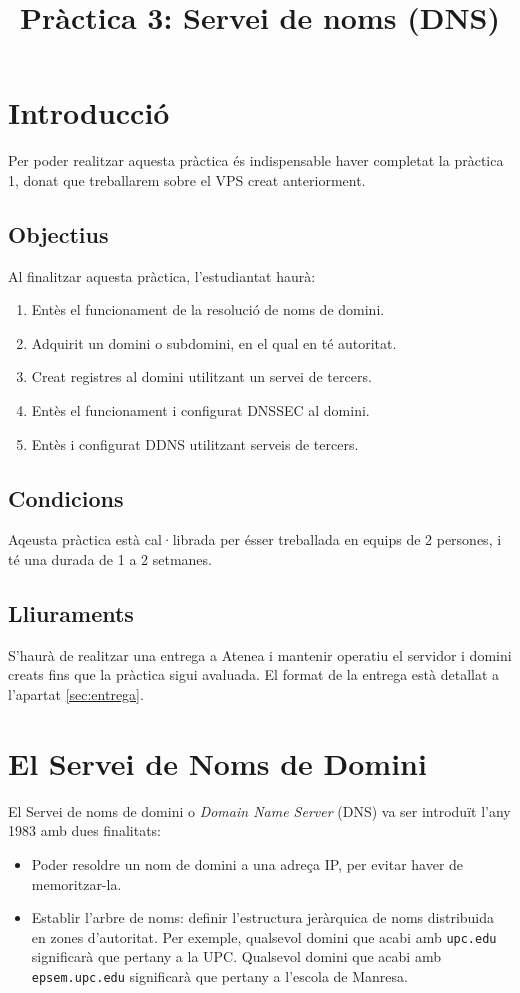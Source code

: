 \documentclass{practicaitic}
\title{Pràctica 3: Servei de noms (DNS)}
\begin{document}
\section{Introducció}

Per poder realitzar aquesta pràctica és indispensable haver completat la
pràctica 1, donat que treballarem sobre el VPS creat anteriorment.

\subsection{Objectius}

Al finalitzar aquesta pràctica, l'estudiantat haurà:
\begin{enumerate}
  \item Entès el funcionament de la resolució de noms de domini.
  \item Adquirit un domini o subdomini, en el qual en té autoritat.
  \item Creat registres al domini utilitzant un servei de tercers.
  \item Entès el funcionament i configurat DNSSEC al domini.
  \item Entès i configurat DDNS utilitzant serveis de tercers.
\end{enumerate}

\subsection{Condicions}

Aqeusta pràctica està cal·librada per ésser treballada en equips de 2 persones,
i té una durada de 1 a 2 setmanes.

\subsection{Lliuraments}

S'haurà de realitzar una entrega a Atenea i mantenir operatiu el servidor 
i domini creats fins que la pràctica sigui avaluada. El format de la entrega està detallat a
l'apartat \ref{sec:entrega}.

\section{El Servei de Noms de Domini}

El Servei de noms de domini o \textit{Domain Name Server} (DNS) va ser introduït
l'any 1983 amb dues finalitats:

\begin{itemize}
  \item Poder resoldre un nom de domini a una adreça IP, per evitar haver de
  memoritzar-la.
  \item Establir l'arbre de noms: definir l'estructura jeràrquica de noms distribuida
  en zones d'autoritat. Per exemple, qualsevol domini que acabi amb \texttt{upc.edu}
  significarà que pertany a la UPC. Qualsevol domini que acabi amb \texttt{epsem.upc.edu}
  significarà que pertany a l'escola de Manresa.
\end{itemize}
\end{document}
